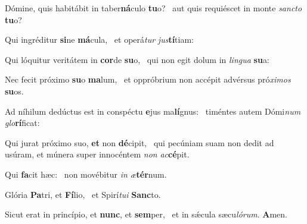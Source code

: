\item Dómine, quis habitábit in taber\textbf{ná}culo \textbf{tu}o?~\psstar{} aut quis requiéscet in monte \textit{sancto} \textbf{tu}o?
\item Qui ingréditur \textbf{si}ne \textbf{má}cula,~\psstar{} et operá\textit{tur} \textit{jus}\textbf{tí}tiam:
\item Qui lóquitur veritátem in \textbf{cor}de \textbf{su}o,~\psstar{} qui non egit dolum in \textit{lingua} \textbf{su}a:
\item Nec fecit próximo \textbf{su}o \textbf{ma}lum,~\psstar{} et oppróbrium non accépit advérsus pró\textit{ximos} \textbf{su}os.
\item Ad níhilum dedúctus est in conspéctu \textbf{e}jus ma\textbf{lí}gnus:~\psstar{} timéntes autem Dómi\textit{num} \textit{glo}\textbf{rí}ficat:
\item Qui jurat próximo suo, \textbf{et} non \textbf{dé}cipit,~\psstar{} qui pecúniam suam non dedit ad usúram, et múnera super innocéntem \textit{non} \textit{ac}\textbf{cé}pit.
\item Qui \textbf{fa}cit hæc:~\psstar{} non movébitur \textit{in} \textit{æ}\textbf{tér}num.
\item Glória \textbf{Pa}tri, et \textbf{Fí}lio,~\psstar{} et Spirí\textit{tui} \textbf{Sanc}to.
\item Sicut erat in princípio, et \textbf{nunc}, et \textbf{sem}per,~\psstar{} et in sǽcula sæcu\textit{lórum}. \textbf{A}men.